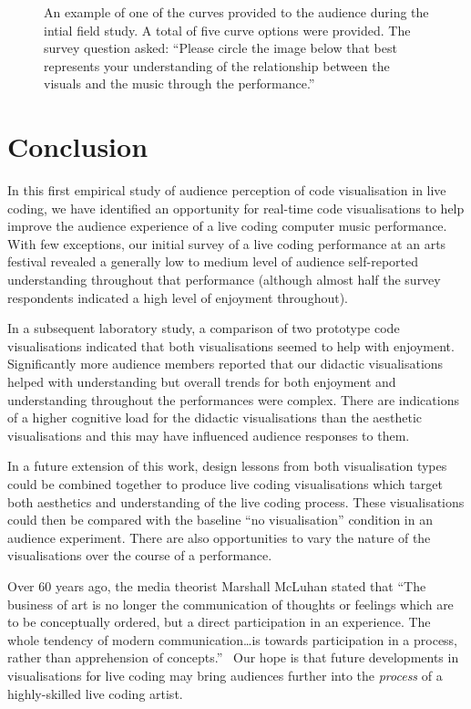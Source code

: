 \documentclass{sig-alternate}
\begin{document}
\begin{figure}
\centering
{}
\caption{An example of one of the curves provided to the audience
during the intial field study. A total of five curve options were
provided. The survey question asked: ``Please circle the image below
that best represents your understanding of the relationship between
the visuals and the music through the performance.''}
\label{fig:understanding-over-time}
\end{figure}

\section{Conclusion}

In this first empirical study of audience perception of code
visualisation in live coding, we have identified an opportunity for
real-time code visualisations to help improve the audience experience
of a live coding computer music performance. With few exceptions, our
initial survey of a live coding performance at an arts festival
revealed a generally low to medium level of audience self-reported
understanding throughout that performance (although almost half the
survey respondents indicated a high level of enjoyment throughout).

In a subsequent laboratory study, a comparison of two prototype code
visualisations indicated that both visualisations seemed to help with
enjoyment. Significantly more audience members reported that our
didactic visualisations helped with understanding but overall trends
for both enjoyment and understanding throughout the performances were
complex. There are indications of a higher cognitive load for the
didactic visualisations than the aesthetic visualisations and this may
have influenced audience responses to them.

In a future extension of this work, design lessons from both
visualisation types could be combined together to produce live coding
visualisations which target both aesthetics and understanding of the
live coding process. These visualisations could then be compared with
the baseline ``no visualisation'' condition in an audience experiment.
There are also opportunities to vary the nature of the visualisations
over the course of a performance.

Over 60 years ago, the media theorist Marshall McLuhan stated that
``The business of art is no longer the communication of thoughts or
feelings which are to be conceptually ordered, but a direct
participation in an experience. The whole tendency of modern
communication\ldots is towards participation in a process, rather than
apprehension of concepts.''~\cite{McLuhan} Our hope is that future
developments in visualisations for live coding may bring audiences
further into the \emph{process} of a highly-skilled live coding
artist.
\end{document}
